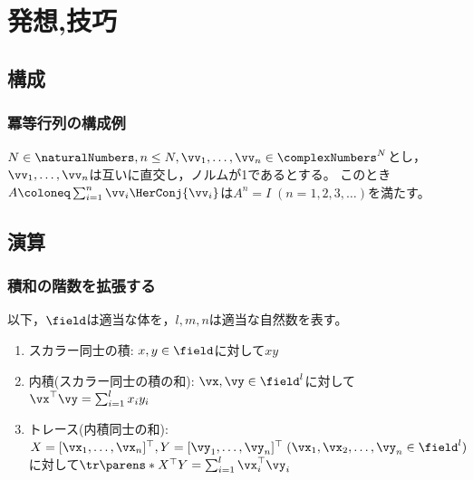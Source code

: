 \chapter{発想,技巧}
    \section{構成}
        \subsection{冪等行列の構成例}
            $N\in\naturalNumbers,n\leq N,\vv_1,\dots,\vv_n\in\complexNumbers^N$とし，$\vv_1,\dots,\vv_n$は互いに直交し，ノルムが1であるとする。
            このとき$A \coloneq \sum_{i=1}^n \vv_i\HerConj{\vv_i}$は$A^n = I\;(n=1,2,3,\dots)$を満たす。
    \section{演算}
        \subsection{積和の階数を拡張する}
            以下，$\field$は適当な体を，$l,m,n$は適当な自然数を表す。
            \begin{enumerate}
                \item スカラー同士の積: $x,y\in\field$に対して$xy$
                \item 内積(スカラー同士の積の和): $\vx,\vy \in \field^l$に対して$\vx^\top\vy = \sum_{i=1}^l x_i y_i$
                \item トレース(内積同士の和): $X = [\vx_1,\dotsc,\vx_n]^\top,Y = [\vy_1,\dotsc,\vy_n]^\top\;(\vx_1,\vx_2,\dotsc,\vy_n \in \field^l)$に対して$\tr\parens*{X^\top Y} = \sum_{i=1}^l \vx_i^\top\vy_i$
            \end{enumerate}
